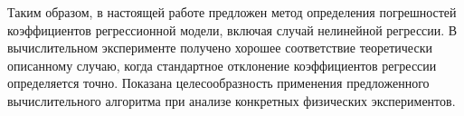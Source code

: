 \documentclass[11pt,a4paper]{article}
\theoremstyle{definition}
\begin{document}
Таким образом, в настоящей работе предложен метод определения
погрешностей коэффициентов регрессионной модели, включая случай нелинейной регрессии. В
вычислительном эксперименте получено хорошее соответствие теоретически описанному случаю, когда
стандартное отклонение коэффициентов регрессии определяется точно.
Показана целесообразность применения предложенного вычислительного
алгоритма при анализе конкретных физических экспериментов.

\FloatBarrier


%
%

\end{document}
